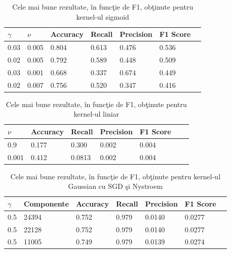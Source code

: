 \begin{table}[H]
    \centering
    \begin{tabularx}{\textwidth}{
        |X
        |X
        |X
        |X
        |X
        |X
        |X|
    }
    \hline
    $\gamma$ & $\nu$ & {Accuracy} & {Recall} & {Precision} & {F1 Score} \\
    \hline
    \rowcolor{gray!20} 0.03	& 0.005	& 0.804 & 0.613	& 0.476 & 0.536\\
    0.02 & 0.005 & 0.792 & 0.589 & 0.448 & 0.509 \\
    \rowcolor{gray!20} 0.03	& 0.001	& 0.668 & 0.337	& 0.674 & 0.449    \\
    0.02 & 0.007 & 0.756 & 0.520 & 0.347 & 0.416 \\
    \hline
  \end{tabularx}
  \caption{Cele mai bune rezultate, în funcţie de F1, obţinute pentru kernel-ul sigmoid}
\end{table}

\begin{table}[H]
    \centering
    \begin{tabularx}{\textwidth}{
        |X
        |X
        |X
        |X
        |X
        |X
        |X|
    }
    \hline
    $\nu$ & {Accuracy} & {Recall} & {Precision} & {F1 Score} \\
    \hline
    \rowcolor{gray!20} 0.9 & 0.177 & 0.300 & 0.002 & 0.004    \\
    0.001 & 0.412	& 0.0813	& 0.002	& 0.004 \\
    \hline
  \end{tabularx}
  \caption{Cele mai bune rezultate, în funcţie de F1, obţinute pentru kernel-ul liniar}
\end{table}

\begin{table}[H]
    \centering
    \begin{tabularx}{\textwidth}{
        |X
        |X
        |X
        |X
        |X
        |X
        |X|
    }
    \hline
    $\gamma$ & {Componente} & {Accuracy} & {Recall} & {Precision} & {F1 Score} \\
    \hline
     0.5 & 24394 & 0.752 & 0.979 & 0.0140	& 0.0277 \\
    \rowcolor{gray!20} 0.5	& 22128	& 0.752 & 0.979	& 0.0140 & 0.0277 \\
    0.5	& 11005	& 0.749	& 0.979	& 0.0139 & 0.0274 \\
    \hline
  \end{tabularx}
  \caption{Cele mai bune rezultate, în funcţie de F1, obţinute pentru kernel-ul Gaussian cu SGD şi Nystroem}
\end{table}

